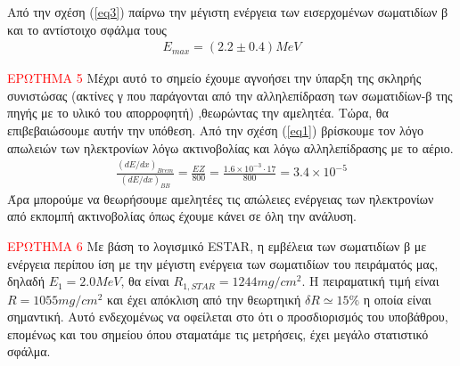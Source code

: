 \documentclass[a4paper]{article}
\begin{document}
				
				Από την σχέση (\ref{eq3}) παίρνω την μέγιστη ενέργεια των εισερχομένων σωματιδίων β και το αντίστοιχο σφάλμα τους \footnotemark
				\begin{align*}
					E_{max} = (2.2 \pm 0.4) MeV
				\end{align*}
				
				
				\textcolor{red}{ΕΡΩΤΗΜΑ 5 }Μέχρι αυτό το σημείο έχουμε αγνοήσει την ύπαρξη της σκληρής συνιστώσας (ακτίνες γ που παράγονται από την αλληλεπίδραση των σωματιδίων-β της πηγής με το υλικό του απορροφητή)
				,θεωρώντας την αμελητέα. Τώρα, θα επιβεβαιώσουμε αυτήν την υπόθεση. Από την σχέση (\ref{eq1}) βρίσκουμε τον λόγο απωλειών των ηλεκτρονίων λόγω ακτινοβολίας και λόγω αλληλεπίδρασης με το αέριο.
				\begin{align*}
					\frac{(dE/dx)_{Brem}}{(dE/dx)_{BB}} = \frac{EZ}{800} = \frac{1.6\times10^{-3} \cdot 17}{800} = 3.4\times10^{-5}
				\end{align*}			
			Άρα μπορούμε να θεωρήσουμε αμελητέες τις απώλειες ενέργειας των ηλεκτρονίων από εκπομπή ακτινοβολίας όπως έχουμε κάνει σε όλη την ανάλυση. 
			
			
			\textcolor{red}{ΕΡΩΤΗΜΑ 6} Με βάση το λογισμικό ESTAR, η εμβέλεια των σωματιδίων β με ενέργεια περίπου ίση με την μέγιστη ενέργεια των σωματιδίων του πειράματός μας, δηλαδή $E_1=2.0MeV$, θα είναι $R_{1,STAR} = 1244 mg/cm^2$.
			Η πειραματική τιμή είναι $R=1055 mg/cm^2$ και έχει απόκλιση από την θεωρτηική $\delta R \simeq 15\% $ η οποία είναι σημαντική. Αυτό ενδεχομένως να οφείλεται στο ότι ο προσδιορισμός του υποβάθρου, επομένως και του σημείου όπου σταματάμε τις μετρήσεις, έχει μεγάλο στατιστικό σφάλμα.
			
\end{document}
